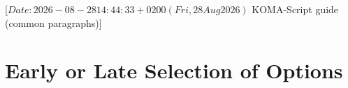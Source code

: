 %
%
%
%
%
%
%

                 [$Date: 2026-08-28 14:44:33 +0200 (Fri, 28 Aug 2026) $
                  KOMA-Script guide (common paragraphs)]

\section{Early or Late Selection of Options}
\BeginIndexGroup
{}%

